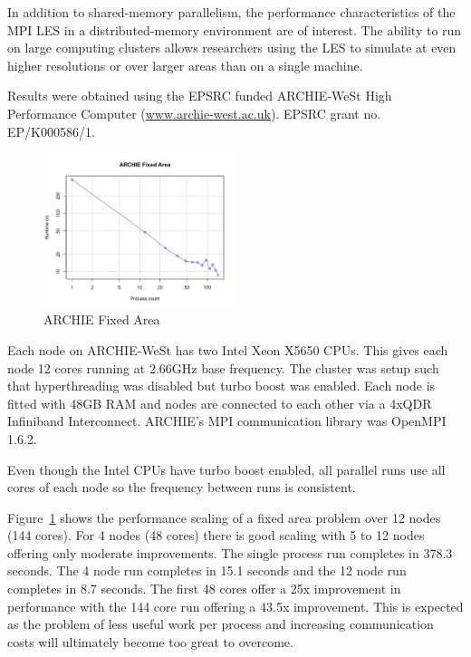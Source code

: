 In addition to shared-memory parallelism, the performance characteristics of the
MPI LES in a distributed-memory environment are of interest. The ability to run
on large computing clusters allows researchers using the LES to simulate at even
higher resolutions or over larger areas than on a single machine.

Results were obtained using the EPSRC funded ARCHIE-WeSt High Performance
Computer (\url{www.archie-west.ac.uk}). EPSRC grant no. EP/K000586/1.

\begin{figure}
    \includegraphics[width=0.5\textwidth]{graphs/ARCHIE-fixed-area.png}
    \caption{ARCHIE Fixed Area}
    \label{fig:archiefixedarea}
\end{figure}

Each node on ARCHIE-WeSt has two Intel Xeon X5650 CPUs. This gives each node 12
cores running at 2.66GHz base frequency. The cluster was setup such that
hyperthreading was disabled but turbo boost was enabled. Each node is fitted
with 48GB RAM and nodes are connected to each other via a 4xQDR Infiniband
Interconnect. ARCHIE's MPI communication library was OpenMPI 1.6.2.

Even though the Intel CPUs have turbo boost enabled, all parallel runs use all
cores of each node so the frequency between runs is consistent.

Figure~\ref{fig:archiefixedarea} shows the performance scaling of a fixed area
problem over 12 nodes (144 cores). For 4 nodes (48 cores) there is good scaling
with 5 to 12 nodes offering only moderate improvements. The single process run
completes in 378.3 seconds. The 4 node run completes in 15.1 seconds and the 12
node run completes in 8.7 seconds. The first 48 cores offer a 25x improvement in
performance with the 144 core run offering a 43.5x improvement. This is expected
as the problem of less useful work per process and increasing communication
costs will ultimately become too great to overcome.

